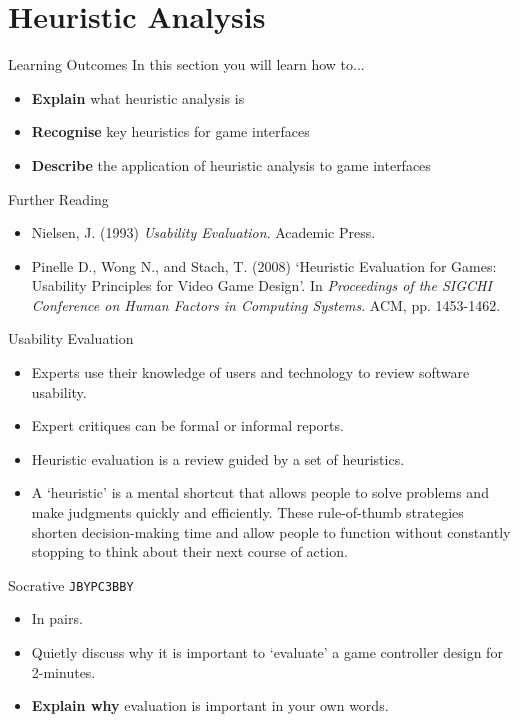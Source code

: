 \part{Heuristic Analysis}
\frame{\partpage}

\begin{frame}{Learning Outcomes}
	In this section you will learn how to...
	
	\begin{itemize}
		\item \textbf{Explain} what heuristic analysis is
		\item \textbf{Recognise} key heuristics for game interfaces
		\item \textbf{Describe} the application of heuristic analysis to game interfaces
	\end{itemize}
\end{frame}

\begin{frame}{Further Reading}
	\begin{itemize}
		\item Nielsen, J. (1993) \textit{Usability Evaluation}. Academic Press.
		\item Pinelle D., Wong N., and Stach, T. (2008) `Heuristic Evaluation for Games: Usability Principles for Video Game Design'. In \textit{Proceedings of the SIGCHI Conference on Human Factors in Computing Systems}. ACM, pp. 1453-1462. 
	\end{itemize}
\end{frame}

\begin{frame}{Usability Evaluation}
	\begin{itemize}
		\item Experts use their knowledge of users and technology to review software usability.
		\item Expert critiques can be formal or informal reports.
		\item Heuristic evaluation is a review guided by a set of heuristics.
		\item A `heuristic' is a mental shortcut that allows people to solve problems and make judgments quickly 
		and efficiently. These rule-of-thumb strategies shorten decision-making time and allow people to function 
		without constantly stopping to think about their next course of action.
	\end{itemize}
\end{frame}

\begin{frame}[fragile]{Socrative \texttt{JBYPC3BBY}}
	\begin{itemize}
		\item In pairs.
		\item Quietly discuss why it is important to `evaluate' a game controller design for 2-minutes.
		\item \textbf{Explain why} evaluation is important in your own words.
	\end{itemize}
\end{frame}


